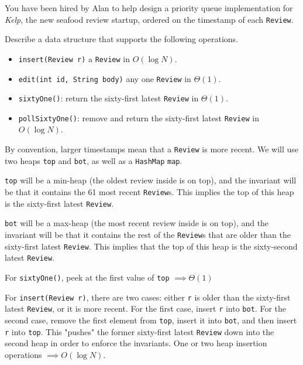 \begin{blocksection}
\question You have been hired by Alan to help design a priority queue
implementation for \emph{Kelp}, the new seafood review startup, ordered on the
timestamp of each \lstinline$Review$.

Describe a data structure that supports the following operations.

\begin{itemize}
\item \lstinline$insert(Review r)$ a \lstinline$Review$ in $O(\log N)$.
\item \lstinline$edit(int id, String body)$ any one \lstinline$Review$ in
$\Theta(1)$.
\item \lstinline$sixtyOne()$: return the sixty-first latest \lstinline$Review$
in $\Theta(1)$.
\item \lstinline$pollSixtyOne()$: remove and return the sixty-first latest
\lstinline$Review$ in $O(\log N)$.
\end{itemize}

\begin{solution}[1.5in]
By convention, larger timestamps mean that a \lstinline$Review$ is more recent. We will use two heaps \lstinline$top$ and \lstinline$bot$, as well as a \lstinline$HashMap$ \lstinline$map$.

\lstinline$top$ will be a min-heap (the oldest review inside is on top), and the invariant will be that it contains the 61 most recent \lstinline$Review$s. This implies the top of this heap is the sixty-first latest \lstinline$Review$.

\lstinline$bot$ will be a max-heap (the most recent review inside is on top), and the invariant will be that it contains the rest of the \lstinline$Review$s that are older than the sixty-first latest \lstinline$Review$. This implies that the top of this heap is the sixty-second latest \lstinline$Review$.

For \lstinline$sixtyOne()$, peek at the first value of \lstinline$top$ $\implies \Theta(1)$

For \lstinline$insert(Review r)$, there are two cases: either \lstinline$r$ is older than the sixty-first latest \lstinline$Review$, or it is more recent. For the first case, insert \lstinline$r$ into \lstinline$bot$. For the second case, remove the first element from \lstinline$top$, insert it into \lstinline$bot$, and then insert \lstinline$r$ into \lstinline$top$. This "pushes" the former sixty-first latest \lstinline$Review$ down into the second heap in order to enforce the invariants. One or two heap insertion operations $\implies O(\log N)$.


\end{solution}
\end{blocksection}
